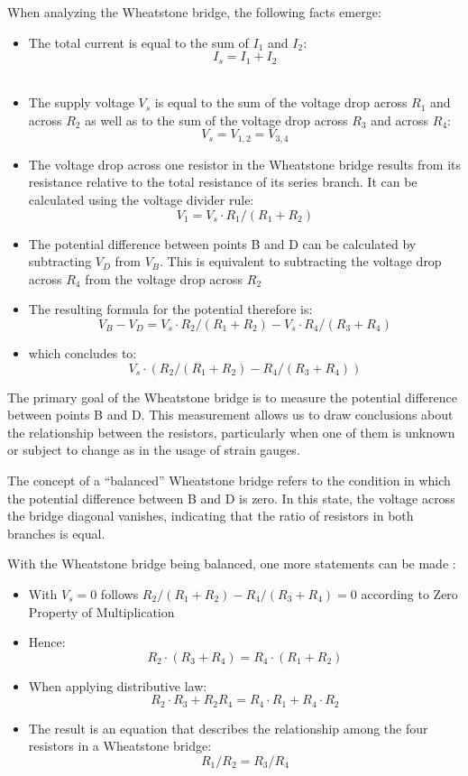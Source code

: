 When analyzing the Wheatstone bridge, the following facts emerge:
\begin{itemize}
	\item The total current is equal to the sum of $I_{1}$ and $I_{2}$: 
	\[ I_{s} = I_{1} + I_{2} \] \cite[149]{Woan:2000}\\
	\item The supply voltage $V_{s}$ is equal to the sum of the voltage drop across $R_{1}$ and across $R_{2}$ as well as to the sum of the voltage drop across $R_{3}$ and across $R_{4}$: 
	\[ V_{s} = V_{1,2} = V_{3,4}  \]\cite[149]{Woan:2000}
	\item The voltage drop across one resistor in the Wheatstone bridge results from its resistance relative to the total resistance of its series branch. It can be calculated using the voltage divider rule: \[ V_{1}= V_{s}\cdot R_{1}/(R_{1}+R_{2}) \] \cite[see][119]{Patrick:2000}
	\item The potential difference between points B and D can be calculated by subtracting $V_{D}$ from $V_{B}$. This is equivalent to subtracting the voltage drop across $R_{4}$ from the voltage drop across $R_{2}$ \cite[see][92]{Bolton:2019}
	\item The resulting formula for the potential therefore is: 
	\[ V_{B} - V_{D} = V_{s}\cdot R_{2}/(R_{1}+R_{2}) - V_{s}\cdot R_{4}/(R_{3}+R_{4}) \] 
	\item which concludes to:  
	\[ V_{s}\cdot (R_{2}/(R_{1}+R_{2}) - R_{4}/(R_{3}+R_{4})) \]
	
\end{itemize}

The primary goal of the Wheatstone bridge is to measure the potential difference between points B and D. This measurement allows us to draw conclusions about the relationship between the resistors, particularly when one of them is unknown or subject to change as in the usage of strain gauges.

The concept of a “balanced” Wheatstone bridge refers to the condition in which the potential difference between B and D is zero. In this state, the voltage across the bridge diagonal vanishes, indicating that the ratio of resistors in both branches is equal.

With the Wheatstone bridge being balanced, one more statements can be made \cite[see][92-93]{Bolton:2019}: 
\begin{itemize}
	\item With $ V_{s} = 0$ follows $R_{2}/(R_{1}+R_{2}) - R_{4}/(R_{3}+R_{4}) = 0 $ according to Zero Property of Multiplication
	\item Hence: 
	\[ R_{2}\cdot (R_{3}+R_{4}) = R_{4}\cdot(R_{1}+R_{2})  \]
	\item When applying distributive law: \[ R_{2}\cdot R_{3} + R_{2} R_{4} = R_{4}\cdot  R_{1} + R_{4}\cdot R_{2} \]
	\item The result is an equation that describes the relationship among the four resistors in a Wheatstone bridge: 
	\[ R_{1}/R_{2}=R_{3}/R_{4} \] 
\end{itemize} 

